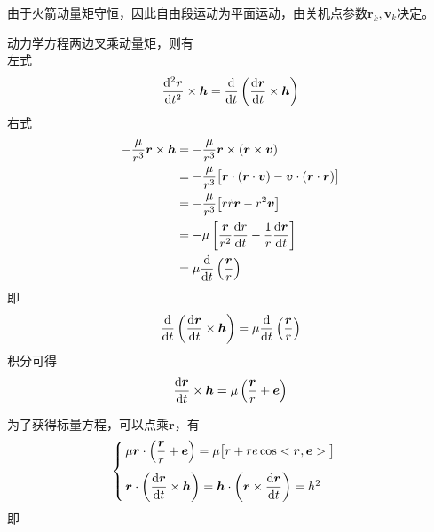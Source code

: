 \noindent 由于火箭动量矩守恒，因此自由段运动为平面运动，由关机点参数$\bm{r}_k,\bm{v}_k$决定。

动力学方程两边叉乘动量矩，则有\\
左式
\begin{equation*}
	\dfrac{{\rm{d}}^2 \bm{r}}{{\rm{d}} t^2} \times \bm{h} = \dfrac{{\rm{d}} }{{\rm{d}} t}\left(\dfrac{{\rm{d}} \bm{r}}{{\rm{d}} t} \times \bm{h}\right)
\end{equation*}
右式
\begin{align*}
	- \dfrac{\mu}{r^3} \bm{r} \times \bm{h} &= - \dfrac{\mu}{r^3}\bm{r} \times (\bm{r} \times \bm{v})\\
	& = -\dfrac{\mu}{r^3} \big[\bm{r} \cdot (\bm{r} \cdot \bm{v}) - \bm{v} \cdot (\bm{r} \cdot \bm{r})\big] \\
	& = - \dfrac{\mu}{r^3}\big[r \dot{r} \bm{r} - r^2 \bm{v}\big]\\
	& = - \mu \left[\dfrac{\bm{r}}{r^2}\dfrac{{\rm{d}} r}{{\rm{d}} t} - \dfrac{1}{r} \dfrac{{\rm{d}} \bm{r}}{{\rm{d}} t}\right]\\
	& = \mu \dfrac{{\rm{d}}}{{\rm{d}} t}\left(\dfrac{\bm{r}}{r}\right)
\end{align*}
即
\begin{equation}
	\dfrac{{\rm{d}} }{{\rm{d}} t}\left(\dfrac{{\rm{d}} \bm{r}}{{\rm{d}} t} \times \bm{h}\right) = \mu \dfrac{{\rm{d}} }{{\rm{d}} t}\left(\dfrac{\bm{r}}{r}\right)
\end{equation}
积分可得
\begin{equation}
	\dfrac{{\rm{d}} \bm{r}}{{\rm{d}} t} \times \bm{h} = \mu \left(\dfrac{\bm{r}}{r} + \bm{e}\right)
\end{equation}

为了获得标量方程，可以点乘$\bm{r}$，有
\begin{equation*}
	\begin{cases}
		\, \mu \bm{r} \cdot \left(\dfrac{\bm{r}}{r} + \bm{e}\right) = \mu \big[r + re\cos <\bm{r}, \bm{e}>\big]\\[1em]
		\, \bm{r}\cdot\left(\dfrac{{\rm{d}} \bm{r}}{{\rm{d}} t} \times \bm{h}\right) = \bm{h} \cdot \left(\bm{r} \times \dfrac{{\rm{d}} \bm{r}}{{\rm{d}} t}\right) = h^2 
	\end{cases}
\end{equation*}
即


